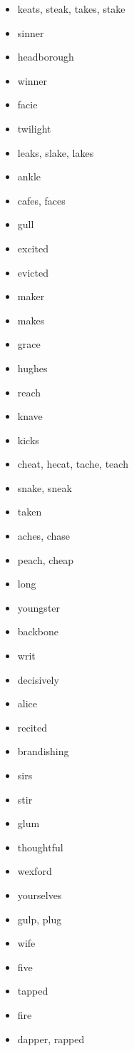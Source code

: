 \documentclass{article}
\begin{document}
\begin{itemize}
    \item keats, steak, takes, stake
    \item sinner
    \item headborough
    \item winner
    \item facie
    \item twilight
    \item leaks, slake, lakes
    \item ankle
    \item cafes, faces
    \item gull
    \item excited
    \item evicted
    \item maker
    \item makes
    \item grace
    \item hughes
    \item reach
    \item knave
    \item kicks
    \item cheat, hecat, tache, teach
    \item snake, sneak
    \item taken
    \item aches, chase
    \item peach, cheap
    \item long
    \item youngster
    \item backbone
    \item writ
    \item decisively
    \item alice
    \item recited
    \item brandishing
    \item sirs
    \item stir
    \item glum
    \item thoughtful
    \item wexford
    \item yourselves
    \item gulp, plug
    \item wife
    \item five
    \item tapped
    \item fire
    \item dapper, rapped

\end{itemize}
\end{document}
